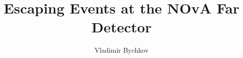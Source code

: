 

\phd %

%
\title{\bf Escaping Events at the NOvA Far Detector}
\author{Vladimir Bychkov}


\abstract{}

\copyrightpage       %

\acknowledgements{}
\dedication{}


\beforepreface

\figurespage
\tablespage

\afterpreface
